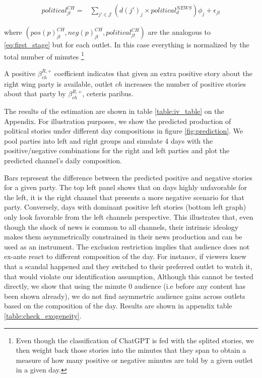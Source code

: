 \documentclass[12pt]{article}
\begin{document}
\begin{equation}\label{eq:pred_neg}
	\begin{aligned}
		political^{CH}_{jt}=&  \sum_{j'\in \mathcal{J} }\left(d(j')_j \times political^{NEWS} _d      \right)\phi_j +\epsilon_{jt}
	\end{aligned}
\end{equation} 


where $(pos(p)^{CH}_{jt},neg(p)^{CH}_{jt},political^{CH}_{jt} )$  are the analogous to \ref{eq:first_stage} but for each outlet. In this case everything is normalized by the total number of minutes \footnote{Even though the classification of ChatGPT is fed with the splited stories, we then weight back those stories into the minutes that they span to obtain a measure of how many positive or negative minutes are told by a given outlet in a given day. } 

A positive $ \beta_{ch}^{R,+} $ coefficient indicates that given an extra positive story about the right wing party is available, outlet $ ch $ increases the number of positive stories about that party by $  \beta_{ch}^{R,+}  $, ceteris paribus. 


The results of the estimation are shown in table \ref{table:iv_table} on the Appendix. For illustration purposes, we show the predicted production of political stories under different day compositions in figure \ref{fig:prediction}. We pool parties into left and right groups and  simulate 4 days with the positive/negative combinations for the right and left parties and plot the predicted channel's daily composition. 

 Bars represent the difference between the predicted positive and negative  stories for a given party. The top left panel shows that on days highly unfavorable for the left, it is the right channel that presents a more negative scenario for that party. Conversely, days with dominant positive left stories (bottom left graph) only look favorable from the left channels perspective. This illustrates that, even though the shock of news is common to all channels, their intrinsic ideology makes them asymmetrically constrained in their news production and can be used as an instrument. The exclusion restriction implies that audience does not ex-ante react to different composition of the day. For instance, if viewers knew that a scandal happened and they switched to their preferred outlet to watch it, that would violate our identification assumption, Although this cannot be tested directly, we show that using the minute 0 audience (i.e before any content has been shown already), we do not find asymmetric audience gains across outlets based on the composition of the day. Results are shown in appendix table \ref{table:check_exogeneity}.
\end{document}
